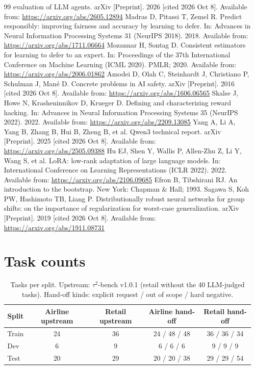 \documentclass[12pt,a4paper]{article}
\newcommand{\tautwo}{$\tau^2$-bench}
\begin{document}
\begin{thebibliography}{99}
evaluation of LLM agents. arXiv [Preprint]. 2026 [cited 2026 Oct 8].
Available from: \url{https://arxiv.org/abs/2605.12894}
 Madras D, Pitassi T, Zemel R. Predict responsibly:
improving fairness and accuracy by learning to defer. In: Advances in Neural
Information Processing Systems 31 (NeurIPS 2018). 2018. Available from:
\url{https://arxiv.org/abs/1711.06664}
 Mozannar H, Sontag D. Consistent estimators for
learning to defer to an expert. In: Proceedings of the 37th International
Conference on Machine Learning (ICML 2020). PMLR; 2020. Available from:
\url{https://arxiv.org/abs/2006.01862}
 Amodei D, Olah C, Steinhardt J, Christiano P, Schulman J,
Man\'e D. Concrete problems in AI safety. arXiv [Preprint]. 2016 [cited 2026
Oct 8]. Available from: \url{https://arxiv.org/abs/1606.06565}
 Skalse J, Howe N, Krasheninnikov D, Krueger D. Defining
and characterizing reward hacking. In: Advances in Neural Information
Processing Systems 35 (NeurIPS 2022). 2022. Available from:
\url{https://arxiv.org/abs/2209.13085}
 Yang A, Li A, Yang B, Zhang B, Hui B, Zheng B, et al. Qwen3
technical report. arXiv [Preprint]. 2025 [cited 2026 Oct 8]. Available from:
\url{https://arxiv.org/abs/2505.09388}
 Hu EJ, Shen Y, Wallis P, Allen-Zhu Z, Li Y, Wang S, et al.
LoRA: low-rank adaptation of large language models. In: International
Conference on Learning Representations (ICLR 2022). 2022. Available from:
\url{https://arxiv.org/abs/2106.09685}
 Efron B, Tibshirani RJ. An introduction to the bootstrap.
New York: Chapman \& Hall; 1993.
 Sagawa S, Koh PW, Hashimoto TB, Liang P. Distributionally
robust neural networks for group shifts: on the importance of regularization
for worst-case generalization. arXiv [Preprint]. 2019 [cited 2026 Oct 8].
Available from: \url{https://arxiv.org/abs/1911.08731}
\end{thebibliography}

\appendix
\section{Task counts}
\label{app:data}

\begin{table}[h]
\centering
\small
\caption{Tasks per split. Upstream: \tautwo{} v1.0.1 (retail without the 40
LLM-judged tasks). Hand-off kinds: explicit request / out of scope / hard
negative.}
\begin{tabular}{lcccc}
\toprule
Split & Airline upstream & Retail upstream & Airline hand-off & Retail hand-off\\
\midrule
Train & 24 & 36 & 24 / 48 / 48 & 36 / 36 / 34\\
Dev   & 6 & 9 & 6 / 6 / 6 & 9 / 9 / 9\\
Test  & 20 & 29 & 20 / 20 / 38 & 29 / 29 / 54\\
\bottomrule
\end{tabular}
\end{table}
\end{document}

